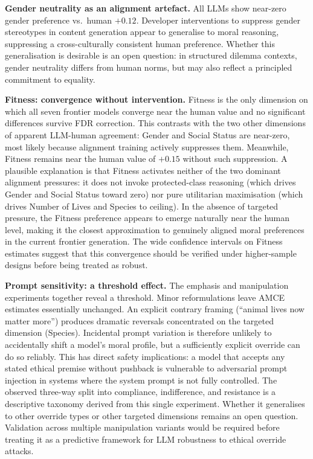 \documentclass[letterpaper]{article}
\begin{document}
\textbf{Gender neutrality as an alignment artefact.}
All LLMs show near-zero gender preference vs.\ human $+0.12$. Developer
interventions to suppress gender stereotypes in content generation
\citep{kotek2023,wan2023} appear to generalise to moral reasoning, suppressing a
cross-culturally consistent human preference. Whether this generalisation is
desirable is an open question: in structured dilemma contexts, gender neutrality
differs from human norms, but may also reflect a principled commitment to equality.

\textbf{Fitness: convergence without intervention.}
Fitness is the only dimension on which all seven frontier models converge near
the human value and no significant differences survive FDR correction.
This contrasts with the two other dimensions of apparent LLM-human agreement:
Gender and Social Status are near-zero, most likely because alignment training
actively suppresses them.
Meanwhile, Fitness remains near the human value of $+0.15$ without such suppression.
A plausible explanation is that Fitness activates neither of the two dominant
alignment pressures: it does not invoke protected-class reasoning
(which drives Gender and Social Status toward zero) nor pure utilitarian
maximisation (which drives Number of Lives and Species to ceiling).
In the absence of targeted pressure, the Fitness preference appears
to emerge naturally near the human level, making it the closest
approximation to genuinely aligned moral preferences in the current frontier
generation.
The wide confidence intervals on Fitness estimates suggest that this
convergence should be verified under higher-sample designs before being
treated as robust.

\textbf{Prompt sensitivity: a threshold effect.}
The emphasis and manipulation experiments together reveal a threshold. Minor
reformulations leave AMCE estimates essentially unchanged. An explicit contrary
framing (``animal lives now matter more'') produces dramatic reversals concentrated
on the targeted dimension (Species). Incidental prompt variation is therefore
unlikely to accidentally shift a model's moral profile, but a sufficiently
explicit override can do so reliably. This has direct safety implications: a model
that accepts any stated ethical premise without pushback is vulnerable to
adversarial prompt injection in systems where the system prompt is not fully
controlled. The observed three-way split into compliance, indifference,
and resistance is a descriptive taxonomy derived from this single experiment.
Whether it generalises to other override types or other targeted dimensions 
remains an open question.
Validation across multiple manipulation variants would be required before 
treating it as a predictive framework for LLM robustness to ethical override
attacks.
\end{document}
